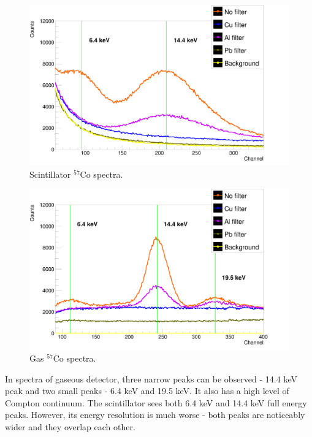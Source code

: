 \begin{figure}[H]
\centering
\includegraphics[scale=0.125, angle = 0]{./pictures/PMTSpectre.png}
\caption{Scintillator $^{57}$Co spectra.}
\label{Scintillator detector spectra.}
\end{figure}

\begin{figure}[H]
\centering
\includegraphics[scale=0.125, angle = 0]{./pictures/GasSpectre.png}
\caption{Gas $^{57}$Co spectra.}
\label{Gas detector spectra.}

\end{figure}


In spectra of gaseous detector, three narrow peaks can be observed - 14.4 keV peak and two small peaks - 6.4 keV and 19.5 keV. It also has a high level of Compton continuum.
The scintillator sees both 6.4 keV and 14.4 keV full energy peaks. However, its energy resolution is much worse - both peaks are noticeably wider and they overlap each other. 

